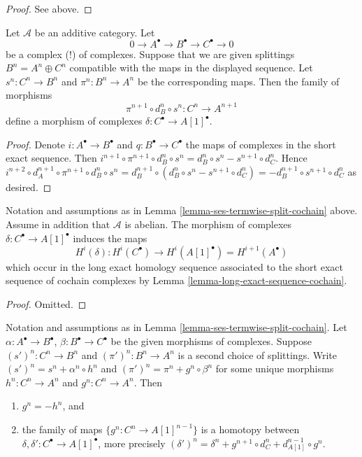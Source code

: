 \begin{proof}
See above.
\end{proof}

\begin{lemma}
\label{lemma-ses-termwise-split-cochain}
Let $\mathcal{A}$ be an additive category.
Let
$$
0 \to A^\bullet \to B^\bullet \to C^\bullet \to 0
$$
be a complex (!) of complexes.
Suppose that we are given splittings $B^n = A^n \oplus C^n$
compatible with the maps in the displayed sequence.
Let $s^n : C^n \to B^n$ and $\pi^n : B^n \to A^n$ be the
corresponding maps. Then the family of morphisms
$$
\pi^{n + 1} \circ d_B^n \circ s^n
:
C^n \to A^{n + 1}
$$
define a morphism of complexes $\delta : C^\bullet \to A[1]^\bullet$.
\end{lemma}

\begin{proof}
Denote $i : A^\bullet \to B^\bullet$ and $q : B^\bullet \to C^\bullet$
the maps of complexes in the short exact sequence. Then
$i^{n + 1} \circ \pi^{n + 1} \circ d_B^n \circ s^n =
d_B^n \circ s^n - s^{n + 1} \circ d_C^n$. Hence
$i^{n + 2} \circ d_A^{n + 1} \circ \pi^{n + 1} \circ d_B^n \circ s^n =
d_B^{n + 1} \circ (d_B^n \circ s^n - s^{n + 1} \circ d_C^n) =
- d_B^{n + 1} \circ s^{n + 1} \circ d_C^n$ as desired.
\end{proof}

\begin{lemma}
\label{lemma-ses-termwise-split-long-cochain}
Notation and assumptions as in
Lemma \ref{lemma-ses-termwise-split-cochain} above.
Assume in addition that $\mathcal{A}$ is abelian.
The morphism of complexes $\delta : C^\bullet \to A[1]^\bullet$
induces the maps
$$
H^i(\delta) :
H^i(C^\bullet) \longrightarrow H^i(A[1]^\bullet) = H^{i + 1}(A^\bullet)
$$
which occur in the long exact homology sequence associated
to the short exact sequence of cochain complexes by
Lemma \ref{lemma-long-exact-sequence-cochain}.
\end{lemma}

\begin{proof}
Omitted.
\end{proof}

\begin{lemma}
\label{lemma-ses-termwise-split-homotopy-cochain}
Notation and assumptions as in
Lemma \ref{lemma-ses-termwise-split-cochain}.
Let $\alpha : A^\bullet \to B^\bullet$,
$\beta : B^\bullet \to C^\bullet$ be the given
morphisms of complexes.
Suppose $(s')^n : C^n \to B^n$ and $(\pi')^n : B^n \to A^n$
is a second choice of splittings.
Write $(s')^n = s^n + \alpha^n \circ h^n$ and
$(\pi')^n = \pi^n + g^n \circ \beta^n$ for some unique
morphisms $h^n : C^n \to A^n$ and $g^n : C^n \to A^n$. Then
\begin{enumerate}
\item $g^n = - h^n$, and
\item the family of maps $\{g^n : C^n \to A[1]^{n - 1}\}$ is a homotopy
between $\delta, \delta' : C^\bullet \to A[1]^\bullet$, more precisely
$(\delta')^n = \delta^n + g^{n + 1} \circ d_C^n + d_{A[1]}^{n - 1} \circ g^n$.
\end{enumerate}
\end{lemma}

